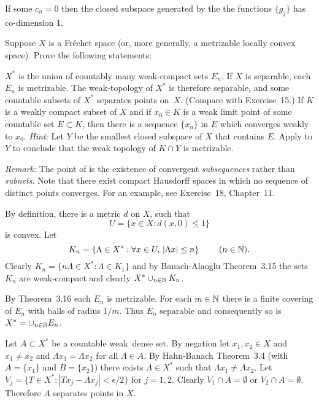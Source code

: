 \begin{enumerate}
If some \(c_n = 0\) then the closed subspace generated by the
the functions \(\{g_j\}\) has co-dimension 1.


\begin{excopy}
Suppose $X$ is a Fr\'echet space (or, more generally, a metrizable locally
convex space). Prove the following statements:
\begin{itemize}
\(X^*\) is the union of countably many weak\upstar-compact sets \(E_n\).
If $X$ is separable, each \(E_n\) is metrizable. The weak\upstar-topology of
\(X^*\) is therefore separable, and some countable subsets of \(X^*\) separates
points on~$X$.
(Compare with Exercise~15.)
If $K$ is a weakly compact subset of $X$ and if \(x_0\in K\) is a  weak limit
point of some countable set \(E\subset K\), then there is a sequence
\(\{x_n\}\) in $E$ which converges weakly to \(x_0\).
\emph{Hint:} Let $Y$ be the smallest closed subspace of $X$ that contains $E$.
Apply  to $Y$ to conclude that the weak topology of \(K \cap Y\) is
metrizable.

\emph{Remark:} The point of  is the existence of convergent
\emph{subsequences} rather than \emph{subnets}. Note that there exist compact
Hausdorff spaces in which no sequence of distinct points converges.
For an example, see Exercise~18, Chapter~11.
\end{itemize}
\end{excopy}

\begin{itemize}
By definition, there is a metric $d$ on $X$, such that
\begin{equation*}
U = \{x\in X: d(x,0) \leq 1\}
\end{equation*}
is convex.
Let 
\begin{equation*}
K_n = \{\Lambda \in X^*: \forall x\in U,\, |\Lambda x| \leq n\}\
\qquad (n\in\mathbb{N}).
\end{equation*}
Clearly \(K_n = \{n\Lambda \in X^*: \Lambda \in K_1\}\) and
by
Banach-Alaoglu Theorem~3.15 the sets \(K_n\) are weak\upstar-compact
and clearly \(X^* \cup_{n\in\mathbb{N}} K_n\).

By Theorem~3.16 each \(E_n\) is metrizable.
For each \(m\in\mathbb{N}\) there is a finite covering of \(E_n\)
with balls of radius \(1/m\). Thus \(E_n\) separable
and consequently so is \(X^* = \cup_{n\in\mathbb{N}} E_n\).

Let \(A \subset X^*\) be a countable weak\upstar\ dense set.
By negation let \(x_1,x_2\in X\) and \(x_1\neq x_2\)
and \(\Lambda x_1 = \Lambda x_2\) for all \(\Lambda \in A\).
By Hahn-Banach Theorem~3.4 
(with \(A=\{x_1\}\) and \(B=\{x_2\}\))
there exists \(\Lambda \in X^*\)
such that \(\Lambda x_1 \neq \Lambda x_2\).
Let
\(V_j = \{T\in X^*: |T x_j - \Lambda x_j| < \epsilon/2\}\)
for \(j=1,2\).
Clearly \(V_1 \cap A = \emptyset\) or \(V_2 \cap A = \emptyset\).
Therefore $A$ separates points  in $X$.


\end{itemize}
\end{enumerate}
